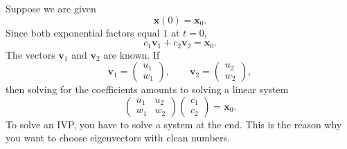 \documentclass[10pt,letterpaper]{article}
\begin{document}
Suppose we are given
\[
\mathbf{x}(0)=\mathbf{x}_0.
\]
Since both exponential factors equal $1$ at $t=0$,
\[
c_1\mathbf{v}_1+c_2\mathbf{v}_2=\mathbf{x}_0.
\]
The vectors $\textbf{v}_1$ and $\textbf{v}_2$ are known. If
\[
\mathbf{v}_1=\begin{pmatrix}u_1\\w_1\end{pmatrix},
\qquad
\mathbf{v}_2=\begin{pmatrix}u_2\\w_2\end{pmatrix},
\]
then solving for the coefficients amounts to solving a linear system 
\[
\begin{pmatrix}
u_1&u_2\\
w_1&w_2
\end{pmatrix}
\begin{pmatrix}c_1\\c_2\end{pmatrix}
=\mathbf{x}_0.
\]
To solve an IVP, you have to solve a system at the end. This is the reason why you want to choose eigenvectors with clean numbers.
\end{document}
